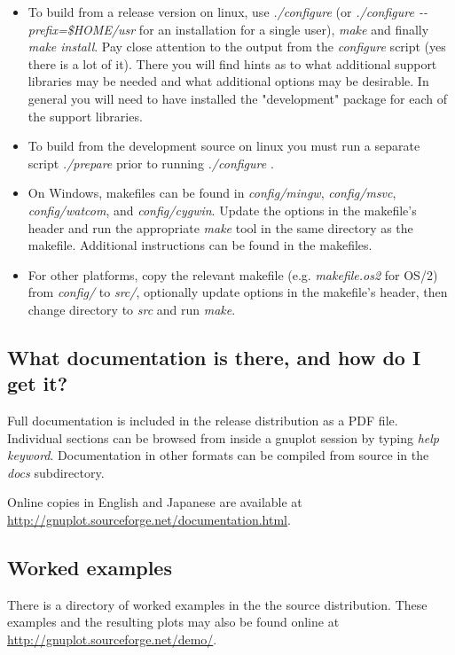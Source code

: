 \documentclass[a4paper,11pt]{article}
\def\http#1{{\small\href{http://#1}{\url{http://#1}}}}
\newcommand{\http}[1]%
            {\htmladdnormallink{\latex{\url{http://#1}}%
                    \html{\textit{http://#1}}}%
                {http://#1}%
            }
\begin{document}
\begin{itemize}
\item
To build from a release version on linux, use \textit{./configure} (or \textit{./configure {-}{-}prefix=\$HOME/usr}
for an installation for a single user), \textit{make} and finally
\textit{make install}.  Pay close attention to the output from the \textit{configure}
script (yes there is a lot of it).
There you will find hints as to what additional support libraries may be needed and
what additional options may be desirable.  In general you will need to have installed
the "development" package for each of the support libraries.
\item
To build from the development source on linux you must run a separate script \textit{./prepare}
prior to running \textit{./configure} .
\item
On Windows, makefiles can be found in \textit{config/mingw}, \textit{config/msvc},
\textit{config/watcom}, and \textit{config/cygwin}. Update the options in the
makefile's header and run the appropriate \textit{make} tool in the same directory
as the makefile. Additional instructions can be found in the makefiles.
\item
For other platforms, copy the relevant makefile (e.g. \textit{makefile.os2} for
OS/2) from \textit{config/} to \textit{src/}, optionally update options in the
makefile's header, then change directory to \textit{src} and run \textit{make}.
\end{itemize}


\subsection{What documentation is there, and how do I get it?}

Full documentation is included in the release distribution as a PDF file.
Individual sections can be browsed from inside a gnuplot session
by typing \textit{help {\em keyword}}.
Documentation in other formats can be compiled from source in the
{\em docs} subdirectory.

Online copies in English and Japanese are available at
\http{gnuplot.sourceforge.net/documentation.html}.

\subsection{Worked examples}

There is a directory of worked examples in the the source distribution.
These examples and the resulting plots may also be found online at
\http{gnuplot.sourceforge.net/demo/}.
\end{document}
